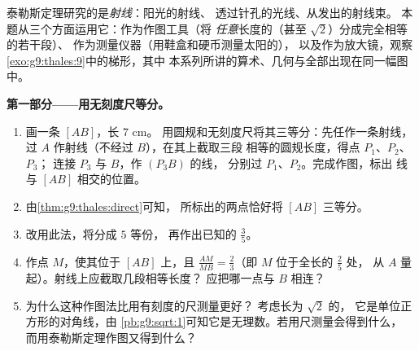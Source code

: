\begin{problem}
\label{pb:g9:thales:1}
泰勒斯定理研究的是\emph{射线}：阳光的射线、
透过针孔的光线、从发出的射线束。
本题从三个方面运用它：作为作图工具（将
\emph{任意}长度的（甚至 $\sqrt2$）分成完全相等的若干段）、
作为测量仪器（用鞋盒和硬币测量太阳的），
以及作为放大镜，观察
\cref{exo:g9:thales:9}中的梯形，其中
本系列所讲的算术、几何与全部出现在同一幅图中。

\medskip
\noindent\textbf{第一部分——用无刻度尺等分。}
\begin{enumerate}
  \item 画一条 $[AB]$，长 $7$ cm。
        用圆规和无刻度尺将其三等分：先任作一条射线，
        过 $A$ 作射线（不经过 $B$），在其上截取三段
        相等的圆规长度，得点 $P_1$、$P_2$、$P_3$；
        连接 $P_3$ 与 $B$，作 $(P_3 B)$ 的线，
        分别过 $P_1$、$P_2$。完成作图，标出
        线与 $[AB]$ 相交的位置。
  \item 由\cref{thm:g9:thales:direct}可知，
        所标出的两点恰好将 $[AB]$ 三等分。
  \item 改用此法，将分成 $5$ 等份，
        再作出已知的 $\frac35$。
  \item 作点 $M$，使其位于 $[AB]$ 上，且
        $\frac{AM}{MB} = \frac23$（即 $M$ 位于全长的 $\frac25$ 处，
        从 $A$ 量起）。射线上应截取几段相等长度？
        应把哪一点与 $B$ 相连？
  \item 为什么这种作图法比用有刻度的尺测量更好？
        考虑长为 $\sqrt2$ 的，
        它是单位正方形的对角线，由
        \cref{pb:g9:sqrt:1}可知它是无理数。若用尺测量会得到什么，
        而用泰勒斯定理作图又得到什么？
\end{enumerate}


\end{problem}
